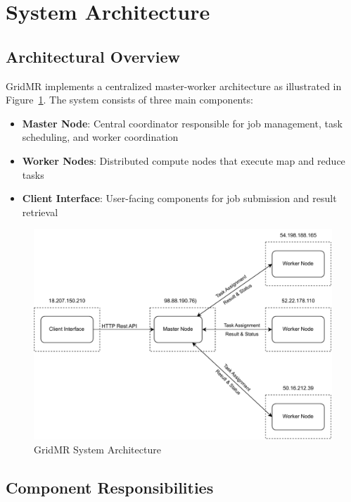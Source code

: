 \documentclass[11pt,letterpaper,oneside]{article}
\begin{document}

\section{System Architecture}

\subsection{Architectural Overview}

GridMR implements a centralized master-worker architecture as illustrated in Figure~\ref{figure:system-architecture}. The system consists of three main components:

\begin{itemize}
    \item \textbf{Master Node}: Central coordinator responsible for job management, task scheduling, and worker coordination
    \item \textbf{Worker Nodes}: Distributed compute nodes that execute map and reduce tasks
    \item \textbf{Client Interface}: User-facing components for job submission and result retrieval
\end{itemize}

\begin{figure}[H]
    \centering
    \includegraphics[width=0.9\linewidth,height=0.90\textheight,keepaspectratio]{images/diagrams/architektur.pdf}
    \caption[System Architecture]{GridMR System Architecture}
    \label{figure:system-architecture}
\end{figure}

\subsection{Component Responsibilities}
\end{document}
